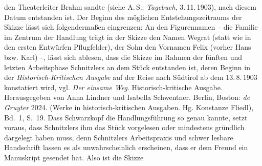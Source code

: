 {{{                  den Theaterleiter Brahm sandte (siehe A. S.: \emph{Tagebuch}, 3. 11. 1903), nach diesem
                  Datum entstanden ist. Der Beginn des möglichen Entstehungszeitraums der Skizze
                  lässt sich folgendermaßen eingrenzen: An den Figurennamen – die Familie im
                  Zentrum der Handlung trägt in der Skizze den Namen Wegrat (statt wie in den
                  ersten Entwürfen Pflugfelder), der Sohn den Vornamen Felix (vorher Hans bzw. Karl)
                  –, lässt sich ablesen, dass die Skizze im Rahmen der fünften und letzten
                  Arbeitsphase Schnitzlers an dem Stück entstanden ist, deren
                  Beginn in der \emph{Historisch-Kritischen Ausgabe} auf der Reise nach Südtirol ab dem
                     13. 8. 1903
                  konstatiert wird, vgl. \emph{Der einsame Weg}. Historisch-kritische
                     Ausgabe. Herausgegeben von Anna Lindner und Isabella Schwentner.
                     Berlin, Boston: \emph{de
                        Gruyter}{ }2024. (Werke in historisch-kritischen Ausgaben. Hg. Konstanze
                     Fliedl), Bd. 1, S. 19. Dass Schwarzkopf die Handlungsführung so genau kannte, setzt voraus, dass Schnitzlers ihm das Stück vorgelesen oder mindestens
                  gründlich dargelegt haben muss, denn Schnitzlers Arbeitspraxis und schwer lesbare Handschrift lassen es als 
                  unwahrscheinlich erscheinen, dass er dem Freund ein Manuskript gesendet hat. Also ist die Skizze
}}}
